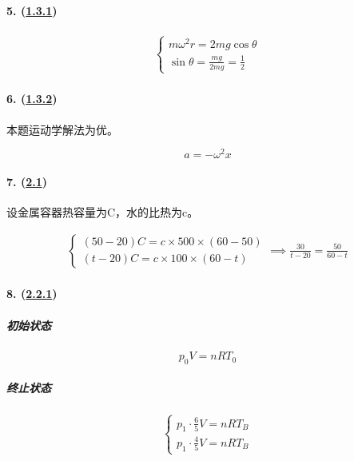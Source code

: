 \paragraph{5. (\hyperref[subsec:1.3.1]{1.3.1})}

\begin{gather*}
    \begin{cases}
        m\omega^2r=2mg\cos\theta\\
        \sin\theta=\frac{mg}{2mg}=\frac12
    \end{cases}
\end{gather*}

\paragraph{6. (\hyperref[subsec:1.3.2]{1.3.2})} 本题运动学解法为优。

\begin{equation*}
    a=-\omega^2x
\end{equation*}

\paragraph{7. (\hyperref[sec:2.1]{2.1})} 设金属容器热容量为C，水的比热为c。

\begin{gather*}
    \begin{cases}
        (50-20)C=c\times500\times(60-50)\\
        (t-20)C=c\times100\times(60-t)
    \end{cases}\implies
    \frac{30}{t-20}=\frac{50}{60-t}
\end{gather*}

\paragraph{8. (\hyperref[subsec:2.2.1]{2.2.1})}

\subparagraph{初始状态}

\begin{equation*}
    p_0V=nRT_0
\end{equation*}

\subparagraph{终止状态}

\begin{equation*}
    \begin{cases}
        p_1\cdot\frac65V=nRT_B\\
        p_1\cdot\frac45V=nRT_B
    \end{cases}
\end{equation*}

